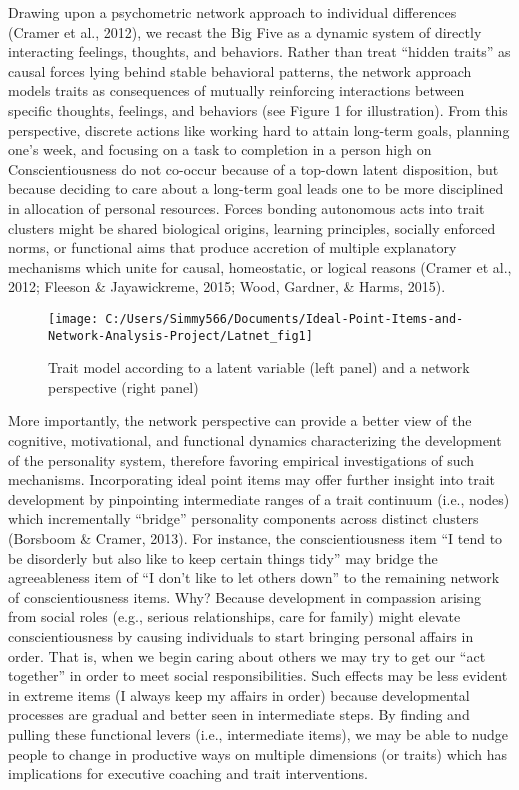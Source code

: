\documentclass[english,man]{apa6}
\theoremstyle{definition}
\theoremstyle{definition}
\theoremstyle{remark}
\begin{document}
Drawing upon a psychometric network approach to individual differences
(Cramer et al., 2012), we recast the Big Five as a dynamic system of
directly interacting feelings, thoughts, and behaviors. Rather than
treat \enquote{hidden traits} as causal forces lying behind stable
behavioral patterns, the network approach models traits as consequences
of mutually reinforcing interactions between specific thoughts,
feelings, and behaviors (see Figure 1 for illustration). From this
perspective, discrete actions like working hard to attain long-term
goals, planning one's week, and focusing on a task to completion in a
person high on Conscientiousness do not co-occur because of a top-down
latent disposition, but because deciding to care about a long-term goal
leads one to be more disciplined in allocation of personal resources.
Forces bonding autonomous acts into trait clusters might be shared
biological origins, learning principles, socially enforced norms, or
functional aims that produce accretion of multiple explanatory
mechanisms which unite for causal, homeostatic, or logical reasons
(Cramer et al., 2012; Fleeson \& Jayawickreme, 2015; Wood, Gardner, \&
Harms, 2015).

\begin{figure}

{\centering \texttt{[image: C:/Users/Simmy566/Documents/Ideal-Point-Items-and-Network-Analysis-Project/Latnet\_fig1]} 

}

\caption{Trait model according to a latent variable (left panel) and a network perspective (right panel)}\label{fig:unnamed-chunk-2}
\end{figure}

More importantly, the network perspective can provide a better view of
the cognitive, motivational, and functional dynamics characterizing the
development of the personality system, therefore favoring empirical
investigations of such mechanisms. Incorporating ideal point items may
offer further insight into trait development by pinpointing intermediate
ranges of a trait continuum (i.e., nodes) which incrementally
\enquote{bridge} personality components across distinct clusters
(Borsboom \& Cramer, 2013). For instance, the conscientiousness item
\enquote{I tend to be disorderly but also like to keep certain things
tidy} may bridge the agreeableness item of \enquote{I don't like to let
others down} to the remaining network of conscientiousness items. Why?
Because development in compassion arising from social roles (e.g.,
serious relationships, care for family) might elevate conscientiousness
by causing individuals to start bringing personal affairs in order. That
is, when we begin caring about others we may try to get our \enquote{act
together} in order to meet social responsibilities. Such effects may be
less evident in extreme items (I always keep my affairs in order)
because developmental processes are gradual and better seen in
intermediate steps. By finding and pulling these functional levers
(i.e., intermediate items), we may be able to nudge people to change in
productive ways on multiple dimensions (or traits) which has
implications for executive coaching and trait interventions.
\end{document}
